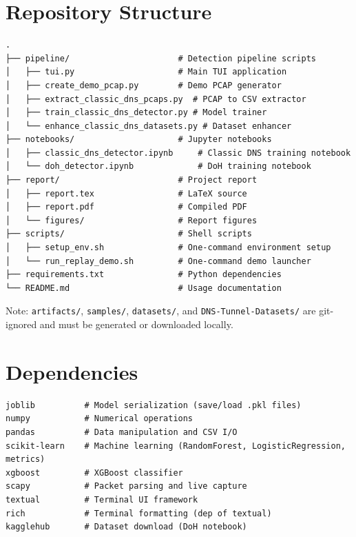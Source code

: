 \documentclass[12pt,a4paper]{article}
\begin{document}
\section{Repository Structure}

\begin{lstlisting}
.
├── pipeline/                      # Detection pipeline scripts
│   ├── tui.py                     # Main TUI application
│   ├── create_demo_pcap.py        # Demo PCAP generator
│   ├── extract_classic_dns_pcaps.py  # PCAP to CSV extractor
│   ├── train_classic_dns_detector.py # Model trainer
│   └── enhance_classic_dns_datasets.py # Dataset enhancer
├── notebooks/                     # Jupyter notebooks
│   ├── classic_dns_detector.ipynb     # Classic DNS training notebook
│   └── doh_detector.ipynb             # DoH training notebook
├── report/                        # Project report
│   ├── report.tex                 # LaTeX source
│   ├── report.pdf                 # Compiled PDF
│   └── figures/                   # Report figures
├── scripts/                       # Shell scripts
│   ├── setup_env.sh               # One-command environment setup
│   └── run_replay_demo.sh         # One-command demo launcher
├── requirements.txt               # Python dependencies
└── README.md                      # Usage documentation
\end{lstlisting}

Note: \texttt{artifacts/}, \texttt{samples/}, \texttt{datasets/}, and \texttt{DNS-Tunnel-Datasets/} are git-ignored and must be generated or downloaded locally.

\section{Dependencies}

\begin{lstlisting}
joblib          # Model serialization (save/load .pkl files)
numpy           # Numerical operations
pandas          # Data manipulation and CSV I/O
scikit-learn    # Machine learning (RandomForest, LogisticRegression, metrics)
xgboost         # XGBoost classifier
scapy           # Packet parsing and live capture
textual         # Terminal UI framework
rich            # Terminal formatting (dep of textual)
kagglehub       # Dataset download (DoH notebook)
\end{lstlisting}
\end{document}
